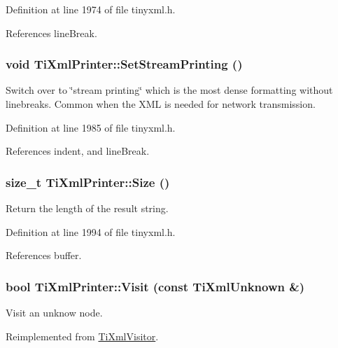 Definition at line 1974 of file tinyxml.h.

References lineBreak.\hypertarget{class_ti_xml_printer_ab23a90629e374cb1cadca090468bbd19}{
\subsubsection[{SetStreamPrinting}]{\setlength{\rightskip}{0pt plus 5cm}void TiXmlPrinter::SetStreamPrinting ()}}
\label{class_ti_xml_printer_ab23a90629e374cb1cadca090468bbd19}
Switch over to \char`\"{}stream printing\char`\"{} which is the most dense formatting without linebreaks. Common when the XML is needed for network transmission. 

Definition at line 1985 of file tinyxml.h.

References indent, and lineBreak.\hypertarget{class_ti_xml_printer_ad01375ae9199bd2f48252eaddce3039d}{
\subsubsection[{Size}]{\setlength{\rightskip}{0pt plus 5cm}size\_\-t TiXmlPrinter::Size ()}}
\label{class_ti_xml_printer_ad01375ae9199bd2f48252eaddce3039d}


Return the length of the result string. 

Definition at line 1994 of file tinyxml.h.

References buffer.\hypertarget{class_ti_xml_printer_a08591a15c9a07afa83c24e08b03d6358}{
\subsubsection[{Visit}]{\setlength{\rightskip}{0pt plus 5cm}bool TiXmlPrinter::Visit (const {\bf TiXmlUnknown} \&)}}
\label{class_ti_xml_printer_a08591a15c9a07afa83c24e08b03d6358}


Visit an unknow node. 

Reimplemented from \hyperlink{class_ti_xml_visitor_a7e284d607d275c51dac1adb58159ce28}{TiXmlVisitor}.

